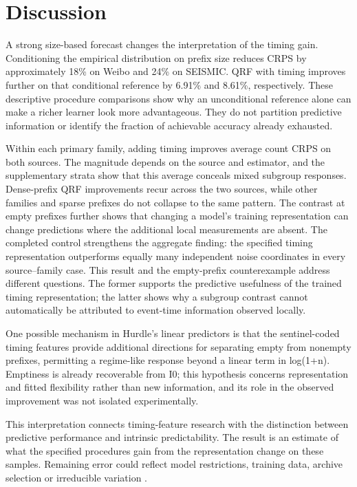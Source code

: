 \hypertarget{discussion}{%
\section{Discussion}}

A strong size-based forecast changes the interpretation of the timing gain. Conditioning the empirical distribution on prefix size reduces CRPS by approximately 18\% on Weibo and 24\% on SEISMIC. QRF with timing improves further on that conditional reference by 6.91\% and 8.61\%, respectively. These descriptive procedure comparisons show why an unconditional reference alone can make a richer learner look more advantageous. They do not partition predictive information or identify the fraction of achievable accuracy already exhausted.

Within each primary family, adding timing improves average count CRPS on both sources. The magnitude depends on the source and estimator, and the supplementary strata show that this average conceals mixed subgroup responses. Dense-prefix QRF improvements recur across the two sources, while other families and sparse prefixes do not collapse to the same pattern. The contrast at empty prefixes further shows that changing a model's training representation can change predictions where the additional local measurements are absent. The completed control strengthens the aggregate finding: the specified timing representation outperforms equally many independent noise coordinates in every source--family case. This result and the empty-prefix counterexample address different questions. The former supports the predictive usefulness of the trained timing representation; the latter shows why a subgroup contrast cannot automatically be attributed to event-time information observed locally.

One possible mechanism in Hurdle's linear predictors is that the sentinel-coded timing features provide additional directions for separating empty from nonempty prefixes, permitting a regime-like response beyond a linear term in log(1+n). Emptiness is already recoverable from I0; this hypothesis concerns representation and fitted flexibility rather than new information, and its role in the observed improvement was not isolated experimentally.

This interpretation connects timing-feature research with the distinction between predictive performance and intrinsic predictability. The result is an estimate of what the specified procedures gain from the representation change on these samples. Remaining error could reflect model restrictions, training data, archive selection or irreducible variation \cite{martin2016,hofman2017}.

